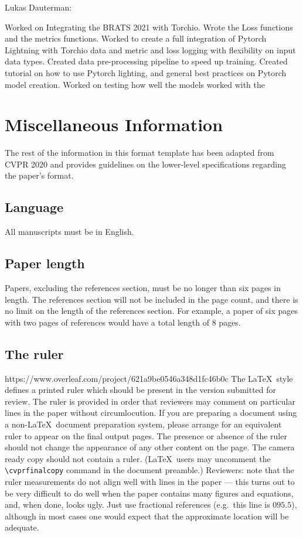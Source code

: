 \documentclass[10pt,twocolumn,letterpaper]{article}
\begin{document}
Lukas Dauterman:

Worked on Integrating the BRATS 2021 with Torchio.
Wrote the Loss functions and the metrics functions.
Worked to create a full integration of Pytorch Lightning with Torchio data and metric and loss logging with flexibility on input data types. 
Created data pre-processing pipeline to speed up training. 
Created tutorial on how to use Pytorch lighting, and general best practices on Pytorch model creation.
Worked on testing how well the models worked with the 


\newpage
\newpage
\section{Miscellaneous Information}

The rest of the information in this format template has been adapted from CVPR 2020 and provides guidelines on the lower-level specifications regarding the paper's format.

\subsection{Language}

All manuscripts must be in English.


\subsection{Paper length}
Papers, excluding the references section,
must be no longer than six pages in length. The references section
will not be included in the page count, and there is no limit on the
length of the references section. For example, a paper of six pages
with two pages of references would have a total length of 8 pages.

\subsection{The ruler}https://www.overleaf.com/project/621a9be0546a348d1fc46b0c
The \LaTeX\ style defines a printed ruler which should be present in the
version submitted for review.  The ruler is provided in order that
reviewers may comment on particular lines in the paper without
circumlocution.  If you are preparing a document using a non-\LaTeX\
document preparation system, please arrange for an equivalent ruler to
appear on the final output pages.  The presence or absence of the ruler
should not change the appearance of any other content on the page.  The
camera ready copy should not contain a ruler. (\LaTeX\ users may uncomment
the \verb'\cvprfinalcopy' command in the document preamble.)  Reviewers:
note that the ruler measurements do not align well with lines in the paper
--- this turns out to be very difficult to do well when the paper contains
many figures and equations, and, when done, looks ugly.  Just use fractional
references (e.g.\ this line is $095.5$), although in most cases one would
expect that the approximate location will be adequate.
\end{document}
